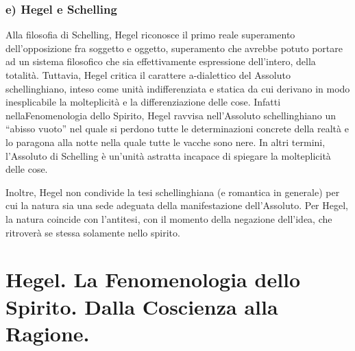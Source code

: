 \documentclass[a4paper,12pt,oneside,openany]{book}%
\begin{document}
\subsubsection*{e) Hegel e Schelling}

Alla filosofia di Schelling, Hegel riconosce il primo reale superamento dell’opposizione fra soggetto e oggetto, superamento che avrebbe potuto portare ad un sistema filosofico che sia effettivamente espressione dell’intero, della totalità. Tuttavia, Hegel critica il carattere a-dialettico del Assoluto schellinghiano, inteso come unità indifferenziata e statica da cui derivano in modo inesplicabile la molteplicità e la differenziazione delle cose. Infatti nellaFenomenologia dello Spirito, Hegel ravvisa nell’Assoluto schellinghiano un “abisso vuoto” nel quale si perdono tutte le determinazioni concrete della realtà e lo paragona alla notte nella quale tutte le vacche sono nere. In altri termini, l’Assoluto di Schelling è un’unità astratta incapace di spiegare la molteplicità delle cose.

Inoltre, Hegel non condivide la tesi schellinghiana (e romantica in generale) per cui la natura sia una sede adeguata della manifestazione dell’Assoluto. Per Hegel, la natura coincide con l’antitesi, con il momento della negazione dell’idea, che ritroverà se stessa solamente nello spirito.
\newpage

\section*{Hegel. La Fenomenologia dello Spirito. Dalla Coscienza alla Ragione.}
	
\end{document}
